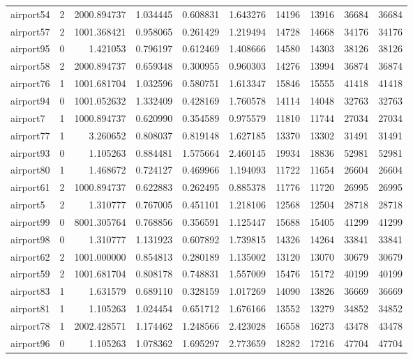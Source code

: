 \begin{longtable}{|l|r|r|r|r|r|r|r|r|r|}
airport54 & 2 & 2000.894737 & 1.034445 & 0.608831 & 1.643276 & 14196 & 13916 & 36684 & 36684 \\
airport57 & 2 & 1001.368421 & 0.958065 & 0.261429 & 1.219494 & 14728 & 14668 & 34176 & 34176 \\
airport95 & 0 & 1.421053 & 0.796197 & 0.612469 & 1.408666 & 14580 & 14303 & 38126 & 38126 \\
airport58 & 2 & 2000.894737 & 0.659348 & 0.300955 & 0.960303 & 14276 & 13994 & 36874 & 36874 \\
airport76 & 1 & 1001.681704 & 1.032596 & 0.580751 & 1.613347 & 15846 & 15555 & 41418 & 41418 \\
airport94 & 0 & 1001.052632 & 1.332409 & 0.428169 & 1.760578 & 14114 & 14048 & 32763 & 32763 \\
airport7 & 1 & 1000.894737 & 0.620990 & 0.354589 & 0.975579 & 11810 & 11744 & 27034 & 27034 \\
airport77 & 1 & 3.260652 & 0.808037 & 0.819148 & 1.627185 & 13370 & 13302 & 31491 & 31491 \\
airport93 & 0 & 1.105263 & 0.884481 & 1.575664 & 2.460145 & 19934 & 18836 & 52981 & 52981 \\
airport80 & 1 & 1.468672 & 0.724127 & 0.469966 & 1.194093 & 11722 & 11654 & 26604 & 26604 \\
airport61 & 2 & 1000.894737 & 0.622883 & 0.262495 & 0.885378 & 11776 & 11720 & 26995 & 26995 \\
airport5 & 2 & 1.310777 & 0.767005 & 0.451101 & 1.218106 & 12568 & 12504 & 28718 & 28718 \\
airport99 & 0 & 8001.305764 & 0.768856 & 0.356591 & 1.125447 & 15688 & 15405 & 41299 & 41299 \\
airport98 & 0 & 1.310777 & 1.131923 & 0.607892 & 1.739815 & 14326 & 14264 & 33841 & 33841 \\
airport62 & 2 & 1001.000000 & 0.854813 & 0.280189 & 1.135002 & 13120 & 13070 & 30679 & 30679 \\
airport59 & 2 & 1001.681704 & 0.808178 & 0.748831 & 1.557009 & 15476 & 15172 & 40199 & 40199 \\
airport83 & 1 & 1.631579 & 0.689110 & 0.328159 & 1.017269 & 14090 & 13826 & 36669 & 36669 \\
airport81 & 1 & 1.105263 & 1.024454 & 0.651712 & 1.676166 & 13552 & 13279 & 34852 & 34852 \\
airport78 & 1 & 2002.428571 & 1.174462 & 1.248566 & 2.423028 & 16558 & 16273 & 43478 & 43478 \\
airport96 & 0 & 1.105263 & 1.078362 & 1.695297 & 2.773659 & 18282 & 17216 & 47704 & 47704 \\

\end{longtable}
